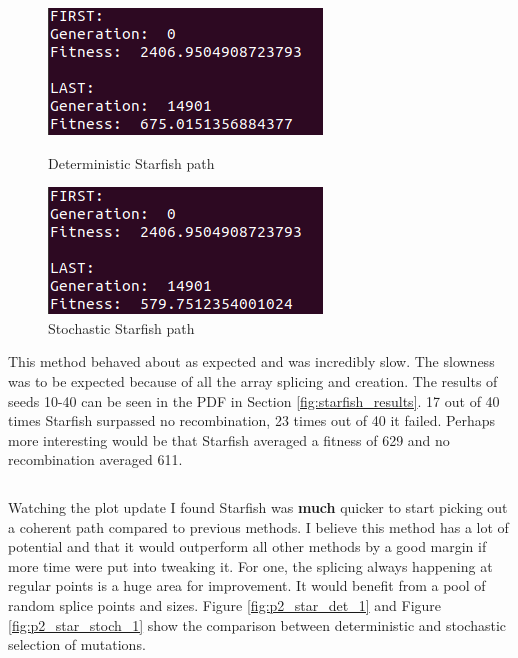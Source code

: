 \documentclass[12pt]{article}
\begin{document}
\begin{figure}[H]
\centering
\begin{minipage}{.45\textwidth}
  \centering
  \includegraphics[width=.75\linewidth]{images/p2_star_det_2}
  \caption{Deterministic Starfish path}
  \label{fig:p2_star_det_2}
\end{minipage}\hfill
\begin{minipage}{.45\textwidth}
  \centering
  \includegraphics[width=.75\linewidth]{images/p2_star_stoch_2}
  \caption{Stochastic Starfish path}
  \label{fig:p2_star_stoch_2}
\end{minipage}
\end{figure}

This method behaved about as expected and was incredibly slow. The slowness was 
to be expected because of all the array splicing and creation. The results of 
seeds 10-40 can be seen in the PDF in Section \ref{fig:starfish_results}. 17 
out of 40 times Starfish surpassed no recombination, 23 times out of 40 it 
failed. Perhaps more interesting would be that Starfish averaged a fitness of 
629 and no recombination averaged 611. 

$$$$

Watching the plot update I found Starfish was \textbf{much} quicker to start 
picking out a coherent path compared to previous methods. I believe this method 
has a lot of potential and that it would outperform all other methods by a good 
margin if more time were put into tweaking it. For one, the splicing always 
happening at regular points is a huge area for improvement. It would benefit 
from a pool of random splice points and sizes. Figure \ref{fig:p2_star_det_1} 
and Figure \ref{fig:p2_star_stoch_1} show the comparison between deterministic 
and stochastic selection of mutations. 
\end{document}
